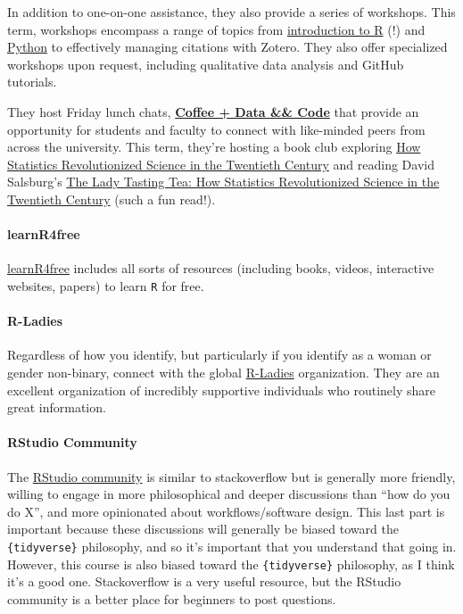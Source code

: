 \documentclass[
  letterpaper,
  DIV=11,
  numbers=noendperiod]{scrartcl}
\let\oldparagraph\paragraph
\renewcommand{\paragraph}[1]{\oldparagraph{#1}\mbox{}}
\begin{document}
In addition to one-on-one assistance, they also provide a series of
workshops. This term, workshops encompass a range of topics from
\href{https://uoregon.libcal.com/event/11326378}{introduction to R} (!)
and \href{https://uoregon.libcal.com/event/11228199}{Python} to
effectively managing citations with Zotero. They also offer specialized
workshops upon request, including qualitative data analysis and GitHub
tutorials.

They host Friday lunch chats,
\href{https://uoregon.libcal.com/event/11326111}{\textbf{Coffee + Data
\&\& Code}} that provide an opportunity for students and faculty to
connect with like-minded peers from across the university. This term,
they're hosting a book club exploring
\href{https://uoregon.libcal.com/event/11326128}{How Statistics
Revolutionized Science in the Twentieth Century} and reading David
Salsburg's \href{https://en.wikipedia.org/wiki/The_Lady_Tasting_Tea}{The
Lady Tasting Tea: How Statistics Revolutionized Science in the Twentieth
Century} (such a fun read!).

\hypertarget{learnr4free}{%
\paragraph{learnR4free}\label{learnr4free}}

\href{https://www.learnr4free.com/en/index.html}{learnR4free} includes
all sorts of resources (including books, videos, interactive websites,
papers) to learn \texttt{R} for free.

\hypertarget{r-ladies}{%
\paragraph{R-Ladies}\label{r-ladies}}

Regardless of how you identify, but particularly if you identify as a
woman or gender non-binary, connect with the global
\href{https://rladies.org/}{R-Ladies} organization. They are an
excellent organization of incredibly supportive individuals who
routinely share great information.

\hypertarget{rstudio-community}{%
\paragraph{RStudio Community}\label{rstudio-community}}

The \href{https://community.rstudio.com/}{RStudio community} is similar
to stackoverflow but is generally more friendly, willing to engage in
more philosophical and deeper discussions than ``how do you do X'', and
more opinionated about workflows/software design. This last part is
important because these discussions will generally be biased toward the
\texttt{\{tidyverse\}} philosophy, and so it's important that you
understand that going in. However, this course is also biased toward the
\texttt{\{tidyverse\}} philosophy, as I think it's a good one.
Stackoverflow is a very useful resource, but the RStudio community is a
better place for beginners to post questions.
\end{document}
